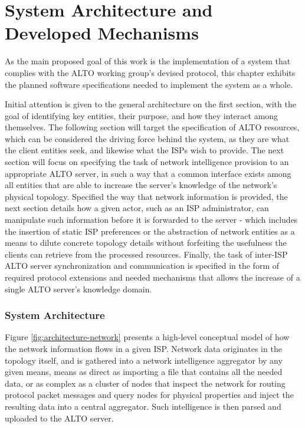 \documentclass[
  oneside,
  11pt, a4paper,
  footinclude=true,
  headinclude=true,
  cleardoublepage=empty
]{scrbook}
\begin{document}
    
	\chapter{System Architecture and Developed Mechanisms}
	
	As the main proposed goal of this work is the implementation of a system that complies with the ALTO working group's devised protocol, this chapter exhibits the planned software specifications needed to implement the system as a whole.
	
	Initial attention is given to the general architecture on the first section, with the goal of identifying key entities, their purpose, and how they interact among themselves. The following section will target the specification of ALTO resources, which can be considered the driving force behind the system, as they are what the client entities seek, and likewise what the ISPs wish to provide. The next section will focus on specifying the task of network intelligence provision to an appropriate ALTO server, in such a way that a common interface exists among all entities that are able to increase the server's knowledge of the network's physical topology. Specified the way that network information is provided, the next section details how a given actor, such as an ISP administrator, can manipulate such information before it is forwarded to the server - which includes the insertion of static ISP preferences or the abstraction of network entities as a means to dilute concrete topology details without forfeiting the usefulness the clients can retrieve from the processed resources. Finally, the task of inter-ISP ALTO server synchronization and communication is specified in the form of required protocol extensions and needed mechanisms that allows the increase of a single ALTO server's knowledge domain.

	\subsection{System Architecture}
	
	Figure \ref{fig:architecture-network} presents a high-level conceptual model of how the network information flows in a given ISP. Network data originates in the topology itself, and is gathered into a network intelligence aggregator by any given means, means as direct as importing a file that contains all the needed data, or as complex as a cluster of nodes that inspect the network for routing protocol packet messages and query nodes for physical properties and inject the resulting data into a central aggregator. Such intelligence is then parsed and uploaded to the ALTO server. 
	
\end{document}
